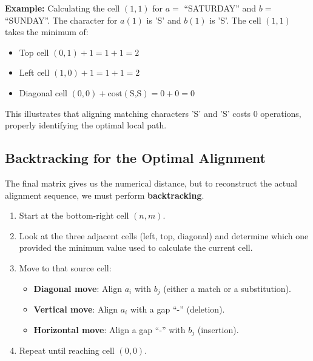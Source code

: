 \vspace{-1em}
\textbf{Example:}
Calculating the cell $(1,1)$ for $a=$ ``SATURDAY'' and $b=$ ``SUNDAY''. The character for $a(1)$ is 'S' and $b(1)$ is 'S'. 
The cell $(1,1)$ takes the minimum of:
\begin{itemize}
    \item Top cell $(0,1) + 1 = 1 + 1 = 2$
    \item Left cell $(1,0) + 1 = 1 + 1 = 2$
    \item Diagonal cell $(0,0) + \text{cost}(\text{S,S}) = 0 + 0 = 0$
\end{itemize}
This illustrates that aligning matching characters 'S' and 'S' costs 0 operations, properly identifying the optimal local path.

\subsection{Backtracking for the Optimal Alignment}

The final matrix gives us the numerical distance, but to reconstruct the actual alignment sequence, we must perform \textbf{backtracking}.

\begin{enumerate}
    \item Start at the bottom-right cell \((n,m)\).
    \item Look at the three adjacent cells (left, top, diagonal) and determine which one provided the minimum value used to calculate the current cell.
    \item Move to that source cell:
    \begin{itemize}
        \item \textbf{Diagonal move}: Align \(a_i\) with \(b_j\) (either a match or a substitution).
        \item \textbf{Vertical move}: Align \(a_i\) with a gap ``-'' (deletion).
        \item \textbf{Horizontal move}: Align a gap ``-'' with \(b_j\) (insertion).
    \end{itemize}
    \item Repeat until reaching cell \((0,0)\).
\end{enumerate}

